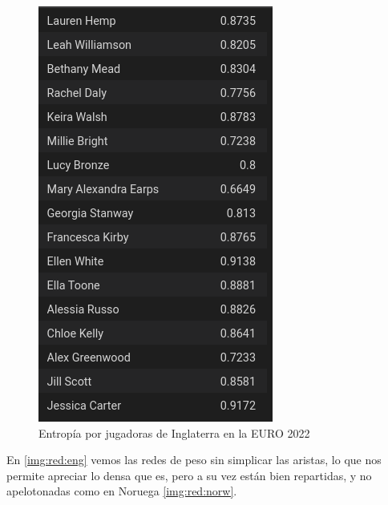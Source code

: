 \begin{figure}[h!tbp]
  \centering
   \includegraphics[width=\textwidth]{./img/entrop_engl.png}
   \caption{Entropía por jugadoras de Inglaterra en la EURO 2022}
   \label{img:ent:eng}
\end{figure}

En \ref{img:red:eng} vemos las redes de peso sin simplicar las aristas, lo que nos permite apreciar lo densa que es, pero a su 
vez están bien repartidas, y no apelotonadas como en Noruega \ref{img:red:norw}.

